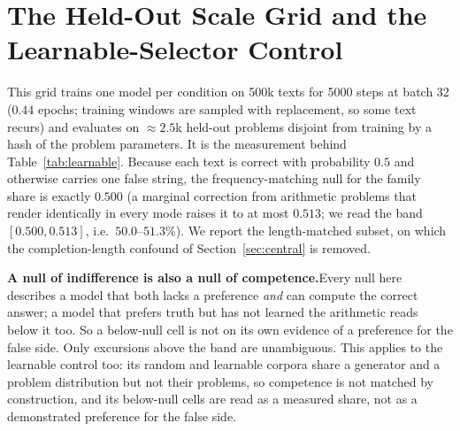 \documentclass{article}
\begin{document}
\section{The Held-Out Scale Grid and the Learnable-Selector Control}
\label{app:scale}

This grid trains one model per condition on 500k texts for 5000 steps at batch 32 ($0.44$ epochs; training windows are sampled with replacement, so some text recurs) and evaluates on ${\approx}2.5$k held-out problems disjoint from training by a hash of the problem parameters. It is the measurement behind Table~\ref{tab:learnable}. Because each text is correct with probability $0.5$ and otherwise carries one false string, the frequency-matching null for the family share is exactly $0.500$ (a marginal correction from arithmetic problems that render identically in every mode raises it to at most $0.513$; we read the band $[0.500, 0.513]$, i.e.\ $50.0$--$51.3\%$). We report the length-matched subset, on which the completion-length confound of Section~\ref{sec:central} is removed.

\textbf{A null of indifference is also a null of competence.}\quad Every null here describes a model that both lacks a preference \emph{and} can compute the correct answer; a model that prefers truth but has not learned the arithmetic reads below it too. So a below-null cell is not on its own evidence of a preference for the false side. Only excursions above the band are unambiguous. This applies to the learnable control too: its random and learnable corpora share a generator and a problem distribution but not their problems, so competence is not matched by construction, and its below-null cells are read as a measured share, not as a demonstrated preference for the false side.
\end{document}
